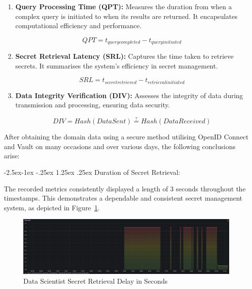\documentclass[review]{elsarticle}
\makeatletter
\renewcommand\paragraph{\@startsection{paragraph}{4}{\z@}%
            {-2.5ex\@plus -1ex \@minus -.25ex}%
            {1.25ex \@plus .25ex}%
            {\normalfont\normalsize\itshape}}
\makeatother
\begin{document}
\begin{enumerate}

  \item \textbf{Query Processing Time (QPT):} Measures the duration from when a complex query is initiated to when its results are returned. It encapsulates computational efficiency and performance.

  \begin{equation}
      QPT = t_{query completed} - t_{query initiated}
  \end{equation}

  \item \textbf{Secret Retrieval Latency (SRL):} Captures the time taken to retrieve secrets. It summarises the system's efficiency in secret management.

  \begin{equation}
      SRL = t_{secret retrieved} - t_{retrieval initiated}
  \end{equation}

  \item \textbf{Data Integrity Verification (DIV):} Assesses the integrity of data during transmission and processing, ensuring data security.

  \begin{equation}
      DIV = Hash(Data Sent) \stackrel{?}{=} Hash(Data Received)
  \end{equation}

\end{enumerate}

After obtaining the domain data using a secure method utilising OpenID Connect and Vault on many occasions and over various days, the following conclusions arise:

\paragraph{Duration of Secret Retrieval:}

The recorded metrics consistently displayed a length of 3 seconds throughout the timestamps. This demonstrates a dependable and consistent secret management system, as depicted in Figure~\ref{dataScientistSecretRetrievalDelayInSeconds}.

\begin{figure}[h]

  \centering

  \includegraphics[width=\textwidth]{images/Secret-Retrieval-Delay-in-Seconds-In-Data-Scientist-Application.png}

  \caption{Data Scientist Secret Retrieval Delay in Seconds }

  \label{dataScientistSecretRetrievalDelayInSeconds}

\end{figure}
\end{document}
